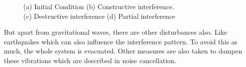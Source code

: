 \begin{figure}[h]
    \centering
    \qquad
    \qquad
    \qquad
    \caption{(a) Initial Condition (b) Constructive interference.\\
    (c) Destructive interference (d) Partial interference}
\end{figure}

But apart from gravitational waves, there are other disturbances also. Like earthquakes which can also influence the interference pattern. To avoid this as much, the whole system is evacuated. Other measures are also taken to dampen these vibrations which are described in noise cancellation.

\pagebreak
